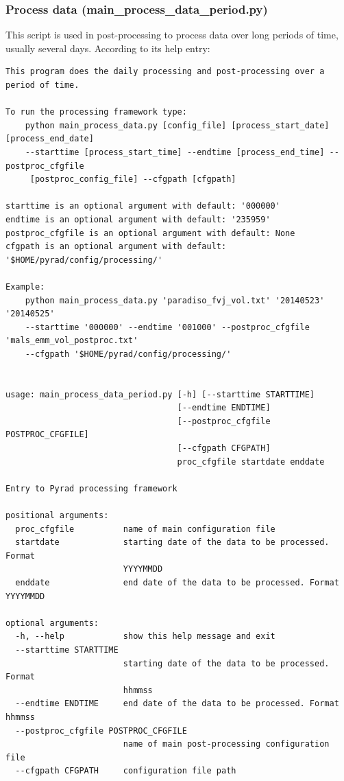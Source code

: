 \documentclass[a4paper,11pt,pdftex,twoside]{scrartcl}
\begin{document}
\subsubsection{Process data (main\_process\_data\_period.py)}
This script is used in post-processing to process data over long periods of time, usually several days.
According to its help entry:
\begin{verbatim}
This program does the daily processing and post-processing over a period of time.

To run the processing framework type:
    python main_process_data.py [config_file] [process_start_date] [process_end_date] 
    --starttime [process_start_time] --endtime [process_end_time] --postproc_cfgfile
     [postproc_config_file] --cfgpath [cfgpath]

starttime is an optional argument with default: '000000'
endtime is an optional argument with default: '235959'
postproc_cfgfile is an optional argument with default: None
cfgpath is an optional argument with default: '$HOME/pyrad/config/processing/'

Example:
    python main_process_data.py 'paradiso_fvj_vol.txt' '20140523' '20140525' 
    --starttime '000000' --endtime '001000' --postproc_cfgfile 'mals_emm_vol_postproc.txt' 
    --cfgpath '$HOME/pyrad/config/processing/'


usage: main_process_data_period.py [-h] [--starttime STARTTIME]
                                   [--endtime ENDTIME]
                                   [--postproc_cfgfile POSTPROC_CFGFILE]
                                   [--cfgpath CFGPATH]
                                   proc_cfgfile startdate enddate

Entry to Pyrad processing framework

positional arguments:
  proc_cfgfile          name of main configuration file
  startdate             starting date of the data to be processed. Format
                        YYYYMMDD
  enddate               end date of the data to be processed. Format YYYYMMDD

optional arguments:
  -h, --help            show this help message and exit
  --starttime STARTTIME
                        starting date of the data to be processed. Format
                        hhmmss
  --endtime ENDTIME     end date of the data to be processed. Format hhmmss
  --postproc_cfgfile POSTPROC_CFGFILE
                        name of main post-processing configuration file
  --cfgpath CFGPATH     configuration file path

\end{verbatim}
\end{document}
